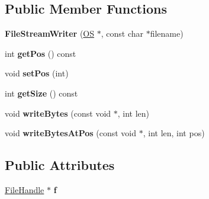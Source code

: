 \subsection*{Public Member Functions}
\begin{DoxyCompactItemize}
\item 
{\bfseries File\+Stream\+Writer} (\hyperlink{class_object_script_1_1_o_s}{OS} $\ast$, const char $\ast$filename)\hypertarget{class_object_script_1_1_o_s_1_1_core_1_1_file_stream_writer_a3adcecce45987259b61c8d9ce41c68c2}{}\label{class_object_script_1_1_o_s_1_1_core_1_1_file_stream_writer_a3adcecce45987259b61c8d9ce41c68c2}

\item 
int {\bfseries get\+Pos} () const \hypertarget{class_object_script_1_1_o_s_1_1_core_1_1_file_stream_writer_ae4f95f53db7f09b34976acb87b88f279}{}\label{class_object_script_1_1_o_s_1_1_core_1_1_file_stream_writer_ae4f95f53db7f09b34976acb87b88f279}

\item 
void {\bfseries set\+Pos} (int)\hypertarget{class_object_script_1_1_o_s_1_1_core_1_1_file_stream_writer_aa7356968591521678d5e3f361002d854}{}\label{class_object_script_1_1_o_s_1_1_core_1_1_file_stream_writer_aa7356968591521678d5e3f361002d854}

\item 
int {\bfseries get\+Size} () const \hypertarget{class_object_script_1_1_o_s_1_1_core_1_1_file_stream_writer_a9cd7dd89e1e83f342bc13ca8a6e80f9e}{}\label{class_object_script_1_1_o_s_1_1_core_1_1_file_stream_writer_a9cd7dd89e1e83f342bc13ca8a6e80f9e}

\item 
void {\bfseries write\+Bytes} (const void $\ast$, int len)\hypertarget{class_object_script_1_1_o_s_1_1_core_1_1_file_stream_writer_a301f8f77695f40eb5250eeeca968abaa}{}\label{class_object_script_1_1_o_s_1_1_core_1_1_file_stream_writer_a301f8f77695f40eb5250eeeca968abaa}

\item 
void {\bfseries write\+Bytes\+At\+Pos} (const void $\ast$, int len, int pos)\hypertarget{class_object_script_1_1_o_s_1_1_core_1_1_file_stream_writer_aeb2b639b19f688b573bcb9c512506bbc}{}\label{class_object_script_1_1_o_s_1_1_core_1_1_file_stream_writer_aeb2b639b19f688b573bcb9c512506bbc}

\end{DoxyCompactItemize}
\subsection*{Public Attributes}
\begin{DoxyCompactItemize}
\item 
\hyperlink{struct_object_script_1_1_o_s_1_1_file_handle}{File\+Handle} $\ast$ {\bfseries f}\hypertarget{class_object_script_1_1_o_s_1_1_core_1_1_file_stream_writer_a89126a67ccae1840d7690f62125639c5}{}\label{class_object_script_1_1_o_s_1_1_core_1_1_file_stream_writer_a89126a67ccae1840d7690f62125639c5}

\end{DoxyCompactItemize}


